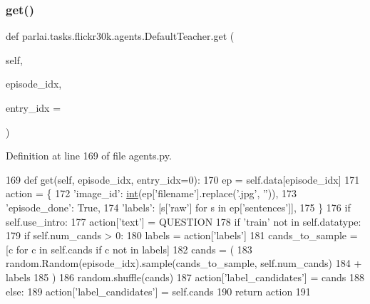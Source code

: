 \subsubsection{\texorpdfstring{get()}{get()}}
{\footnotesize\ttfamily def parlai.\+tasks.\+flickr30k.\+agents.\+Default\+Teacher.\+get (\begin{DoxyParamCaption}\item[{}]{self,  }\item[{}]{episode\+\_\+idx,  }\item[{}]{entry\+\_\+idx = {} }\end{DoxyParamCaption})}



Definition at line 169 of file agents.\+py.


\begin{DoxyCode}
169     \textcolor{keyword}{def }get(self, episode\_idx, entry\_idx=0):
170         ep = self.data[episode\_idx]
171         action = \{
172             \textcolor{stringliteral}{'image\_id'}: \hyperlink{namespacelanguage__model_1_1eval__ppl_a7d12ee00479673c5c8d1f6d01faa272a}{int}(ep[\textcolor{stringliteral}{'filename'}].replace(\textcolor{stringliteral}{'.jpg'}, \textcolor{stringliteral}{''})),
173             \textcolor{stringliteral}{'episode\_done'}: \textcolor{keyword}{True},
174             \textcolor{stringliteral}{'labels'}: [s[\textcolor{stringliteral}{'raw'}] \textcolor{keywordflow}{for} s \textcolor{keywordflow}{in} ep[\textcolor{stringliteral}{'sentences'}]],
175         \}
176         \textcolor{keywordflow}{if} self.use\_intro:
177             action[\textcolor{stringliteral}{'text'}] = QUESTION
178         \textcolor{keywordflow}{if} \textcolor{stringliteral}{'train'} \textcolor{keywordflow}{not} \textcolor{keywordflow}{in} self.datatype:
179             \textcolor{keywordflow}{if} self.num\_cands > 0:
180                 labels = action[\textcolor{stringliteral}{'labels'}]
181                 cands\_to\_sample = [c \textcolor{keywordflow}{for} c \textcolor{keywordflow}{in} self.cands \textcolor{keywordflow}{if} c \textcolor{keywordflow}{not} \textcolor{keywordflow}{in} labels]
182                 cands = (
183                     random.Random(episode\_idx).sample(cands\_to\_sample, self.num\_cands)
184                     + labels
185                 )
186                 random.shuffle(cands)
187                 action[\textcolor{stringliteral}{'label\_candidates'}] = cands
188             \textcolor{keywordflow}{else}:
189                 action[\textcolor{stringliteral}{'label\_candidates'}] = self.cands
190         \textcolor{keywordflow}{return} action
191 
\end{DoxyCode}
\mbox{\label{classparlai_1_1tasks_1_1flickr30k_1_1agents_1_1DefaultTeacher_ada88912036e5d75c2f2a5bff298b1d88}} 
